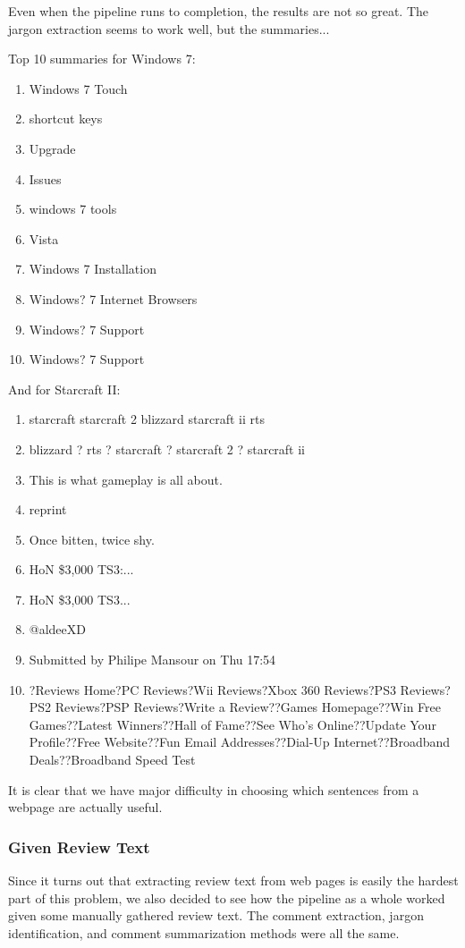 \documentclass{article}
\begin{document}
Even when the pipeline runs to completion, the results are not so great.
The jargon extraction seems to work well, but the summaries...

Top 10 summaries for Windows 7:
\begin{enumerate}
\item Windows 7 Touch
\item shortcut keys
\item Upgrade
\item Issues
\item windows 7 tools
\item Vista
\item Windows 7 Installation
\item Windows? 7 Internet Browsers
\item Windows? 7 Support
\item Windows? 7 Support
\end{enumerate}

And for Starcraft II:
\begin{enumerate}
\item starcraft
  starcraft 2
  blizzard
  starcraft ii
  rts
\item blizzard ? rts ? starcraft ? starcraft 2 ? starcraft ii
\item This is what gameplay is all about.
\item reprint
\item Once bitten, twice shy.
\item HoN \$3,000 TS3:...
\item HoN \$3,000 TS3...
\item @aldeeXD
\item Submitted by Philipe Mansour on Thu 17:54
\item?Reviews Home?PC Reviews?Wii Reviews?Xbox 360 Reviews?PS3 Reviews?PS2 Reviews?PSP Reviews?Write a Review??Games Homepage??Win Free Games??Latest Winners??Hall of Fame??See Who's Online??Update Your Profile??Free Website??Fun Email Addresses??Dial-Up Internet??Broadband Deals??Broadband Speed Test
\end{enumerate}

It is clear that we have major difficulty in choosing which sentences from a
webpage are actually useful.

\subsubsection{Given Review Text}

Since it turns out that extracting review text from web pages is easily the
hardest part of this problem, we also decided to see how the pipeline as a whole
worked given some manually gathered review text. The comment extraction,
jargon identification, and comment summarization methods were all the same.
\end{document}

